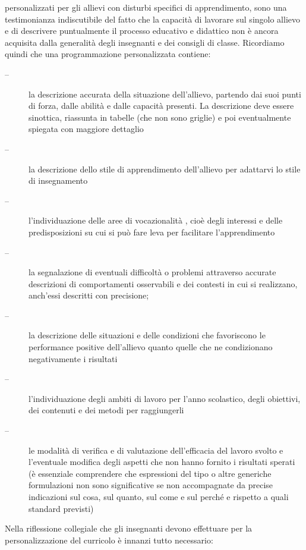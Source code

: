 \begin{description}
	personalizzati per gli allievi con disturbi specifici di apprendimento, sono una testimonianza
	indiscutibile del fatto che la capacità di lavorare sul singolo allievo e di descrivere puntualmente il
	processo educativo e didattico non è ancora acquisita dalla generalità degli insegnanti e dei consigli di
	classe.
	Ricordiamo quindi che una programmazione personalizzata contiene:
	\begin{description}
		\item[--] la descrizione accurata della situazione dell'allievo, partendo dai suoi punti di forza, dalle
		abilità e dalle capacità presenti. La descrizione deve essere sinottica, riassunta in tabelle (che
		non sono griglie) e poi eventualmente spiegata con maggiore dettaglio
		\item[--] la descrizione dello stile di apprendimento dell'allievo per adattarvi lo stile di insegnamento
		\item[--] l'individuazione delle aree di vocazionalità , cioè degli interessi e delle predisposizioni su cui si
		può fare leva per facilitare l'apprendimento
		\item[--] la segnalazione di eventuali difficoltà o problemi attraverso accurate descrizioni di
		comportamenti osservabili e dei contesti in cui si realizzano, anch'essi descritti con precisione;
		\item[--] la descrizione delle situazioni e delle condizioni che favoriscono le performance positive
		dell'allievo quanto quelle che ne condizionano negativamente i risultati
		\item[--] l'individuazione degli ambiti di lavoro per l'anno scolastico, degli obiettivi, dei contenuti e dei
		metodi per raggiungerli
		\item[--] le modalità di verifica e di valutazione dell'efficacia del lavoro svolto e l'eventuale modifica
		degli aspetti che non hanno fornito i risultati sperati (è essenziale comprendere che espressioni
		del tipo  o altre generiche formulazioni non sono significative se non
		accompagnate da precise indicazioni sul cosa, sul quanto, sul come e sul perché e rispetto a
		quali standard previsti) 
	\end{description}

	Nella riflessione collegiale che gli insegnanti devono effettuare per la personalizzazione del curricolo è
	innanzi tutto necessario:
	

\end{description}
